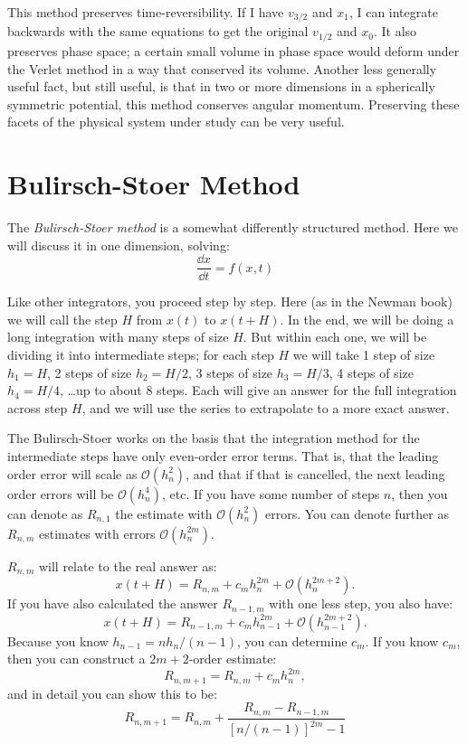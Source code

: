 This method preserves time-reversibility. If I have $v_{3/2}$ and
$x_1$, I can integrate backwards with the same equations to get the
original $v_{1/2}$ and $x_0$. It also preserves phase space; a certain
small volume in phase space would deform under the Verlet method in a
way that conserved its volume. Another less generally useful fact, but
still useful, is that in two or more dimensions in a spherically
symmetric potential, this method conserves angular
momentum. Preserving these facets of the physical system under study
can be very useful.

\section{Bulirsch-Stoer Method}

The {\it Bulirsch-Stoer method} is a somewhat differently structured
method. Here we will discuss it in one dimension, solving:
\begin{equation}
\frac{\dd{x}}{\dd{t}} = f(x,t)
\end{equation}

Like other integrators, you proceed step by step. Here (as in the
Newman book) we will call the step $H$ from $x(t)$ to $x(t+H)$. In the
end, we will be doing a long integration with many steps of size
$H$. But within each one, we will be dividing it into intermediate
steps; for each step $H$ we will take 1 step of size $h_1 =H$, 2 steps
of size $h_2 = H / 2$, 3 steps of size $h_3 = H/3$, 4 steps of size
$h_4 = H / 4$, \ldots up to about 8 steps.  Each will give an answer
for the full integration across step $H$, and we will use the series
to extrapolate to a more exact answer.

The Bulirsch-Stoer works on the basis that the integration method for
the intermediate steps have only even-order error terms. That is, that
the leading order error will scale as $\mathcal{O}(h_n^{2})$, and that
if that is cancelled, the next leading order errors will be
$\mathcal{O}(h_n^4)$, etc. If you have some number of steps $n$, then
you can denote as $R_{n,1}$ the estimate with $\mathcal{O}(h_n^{2})$
errors.  You can denote further as $R_{n,m}$ estimates with errors
$\mathcal{O}(h_n^{2m})$.

$R_{n,m}$ will relate to the real answer as:
\begin{equation}
x(t+H) = R_{n,m} + c_m h_n^{2m} + \mathcal{O}(h_n^{2m+2}).
\end{equation}
If you have also calculated the answer $R_{n-1,m}$ with one less step,
you also have:
\begin{equation}
x(t+H) = R_{n-1,m} + c_m h_{n-1}^{2m} + \mathcal{O}(h_{n-1}^{2m+2}).
\end{equation}
Because you know $h_{n-1} = n h_n / (n-1)$, you can determine $c_m$.
If you know $c_m$, then you can construct a $2m+2$-order estimate:
\begin{equation}
  R_{n,m+1} = R_{n,m} +c_mh_n^{2m},
\end{equation}
and in detail you can show this to be:
\begin{equation}
  R_{n,m+1} = R_{n,m} + \frac{R_{n,m} - R_{n-1,
      m}}{\left[n/(n-1)\right]^{2m} -1}
\end{equation}

